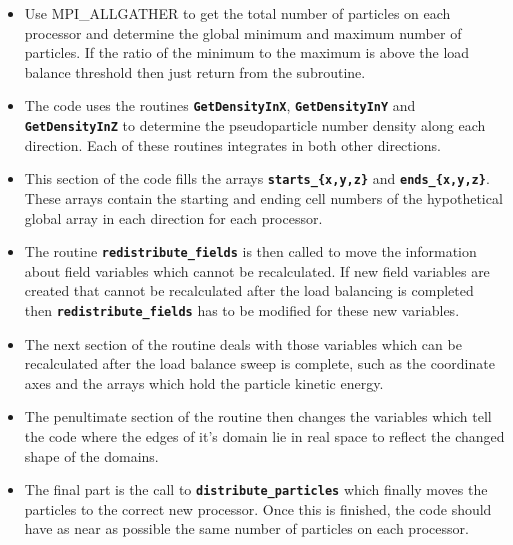 \documentclass[12pt,a4paper]{article}
\newcommand{\inlinecode}[1]{{\color{warwickred} \bf\texttt{#1}}}
\begin{document}
\begin{itemize}
\item Use MPI\_ALLGATHER to get the total number of particles on each processor
  and determine the global minimum and maximum number of particles. If the
  ratio of the minimum to the maximum is above the load balance threshold then
  just return from the subroutine.
\item The code uses the routines \inlinecode{GetDensityInX},
  \inlinecode{GetDensityInY} and \inlinecode{GetDensityInZ} to determine the
  pseudoparticle number density along each direction. Each of these routines
  integrates in both other directions.
\item This section of the code fills the arrays \inlinecode{starts\_\{x,y,z\}}
  and \inlinecode{ends\_\{x,y,z\}}. These arrays contain the starting and
  ending cell numbers of the hypothetical global array in each direction for
  each processor.
\item The routine \inlinecode{redistribute\_fields} is then called to move the
  information about field variables which cannot be recalculated. If new field
  variables are created that cannot be recalculated after the load balancing is
  completed then \inlinecode{redistribute\_fields} has to be modified for these
  new variables.
\item The next section of the routine deals with those variables which can be
  recalculated after the load balance sweep is complete, such as the coordinate
  axes and the arrays which hold the particle kinetic energy.
\item The penultimate section of the routine then changes the variables which
  tell the code where the edges of it's domain lie in real space to reflect the
  changed shape of the domains.
\item The final part is the call to \inlinecode{distribute\_particles} which
  finally moves the particles to the correct new processor. Once this is
  finished, the code should have as near as possible the same number of
  particles on each processor.
\end{itemize}
\end{document}
